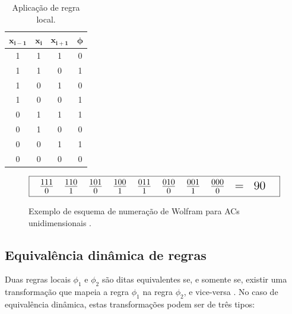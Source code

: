 \documentclass[12pt,a4paper]{article}
\begin{document}
\begin{table}[htp]
\begin{center}
\begin{tabular}{|c|c|c|c|}
\hline
$\mathbf{x_{i-1}}$ & $\mathbf{x_i}$ & $\mathbf{x_{i+1}}$ & $\mathbf{\phi}$ \\ \hline
1 & 1 & 1 & 0 \\ \hline
1 & 1 & 0 & 1 \\ \hline
1 & 0 & 1 & 0 \\ \hline
1 & 0 & 0 & 1 \\ \hline
0 & 1 & 1 & 1 \\ \hline
0 & 1 & 0 & 0 \\ \hline
0 & 0 & 1 & 1 \\ \hline
0 & 0 & 0 & 0 \\ \hline
\end{tabular}
\caption{Aplicação de regra local.}
\label{tab:localrule}
\end{center}
\end{table}

\begin{figure}[htp]
\begin{center}
\[ \fbox {
{\Large
\begin{tabular}{c c c c c c c c c c c}
$\frac{1 1 1}{0}$ & $\frac{1 1 0}{1}$ & $\frac{1 0 1}{0}$ & $\frac{1 0 0}{1}$ &
$\frac{0 1 1}{1}$ & $\frac{0 1 0}{0}$ & $\frac{0 0 1}{1}$ & $\frac{0 0 0}{0}$ &
= & 90
\end{tabular}
}
} \]
\caption[Exemplo de esquema de numeração de Wolfram para ACs unidimensionais]
{Exemplo de esquema de numeração de Wolfram para ACs unidimensionais
.}
\label{fig:celnumbering}
\end{center}
\end{figure}

\subsection{Equivalência dinâmica de regras}

Duas regras locais ${\phi}_1$ e ${\phi}_2$ são ditas equivalentes se, e somente se, existir
uma transformação que mapeia a regra ${\phi}_1$ na regra ${\phi}_2$, e vice-versa
. No caso de equivalência dinâmica, estas transformações
podem ser de três tipos:
\end{document}
